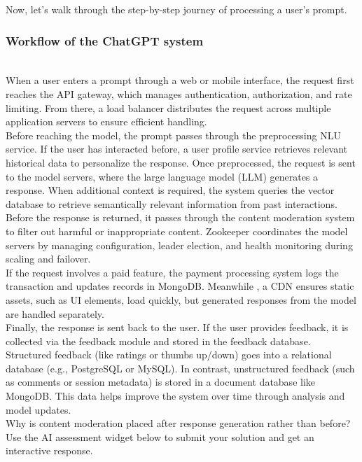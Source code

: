 Now, let's walk through the step-by-step journey of processing a user's prompt.

\subsubsection{Workflow of the ChatGPT system}\label{Os0AYFBmmeodEi7wY7Yjl}
\\
When a user enters a prompt through a web or mobile interface, the request first reaches the API gateway, which manages authentication, authorization, and rate limiting. From there, a load balancer distributes the request across multiple application servers to ensure efficient handling.
\\
Before reaching the model, the prompt passes through the preprocessing NLU service. If the user has interacted before, a user profile service retrieves relevant historical data to personalize the response. Once preprocessed, the request is sent to the model servers, where the large language model (LLM) generates a response. When additional context is required, the system queries the vector database to retrieve semantically relevant information from past interactions.
\\
Before the response is returned, it passes through the content moderation system to filter out harmful or inappropriate content. Zookeeper coordinates the model servers by managing configuration, leader election, and health monitoring during scaling and failover.
\\
If the request involves a paid feature, the payment processing system logs the transaction and updates records in MongoDB. Meanwhile , a CDN ensures static assets, such as UI elements, load quickly, but generated responses from the model are handled separately.
\\
Finally, the response is sent back to the user. If the user provides feedback, it is collected via the feedback module and stored in the feedback database. Structured feedback (like ratings or thumbs up/down) goes into a relational database (e.g., PostgreSQL or MySQL). In contrast, unstructured feedback (such as comments or session metadata) is stored in a document database like MongoDB. This data helps improve the system over time through analysis and model updates.
\\
Why is content moderation placed after response generation rather than before?
\\
Use the AI assessment widget below to submit your solution and get an interactive response.

